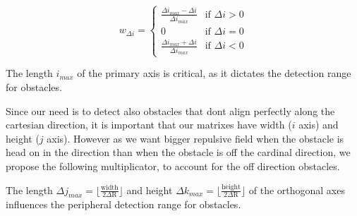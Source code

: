 \documentclass[letterpaper, 10 pt, conference]{ieeeconf}  %
\begin{document}
\begin{equation}
	w_{\Delta i} = 
	\begin{cases} 
	 	\frac{\Delta i_{max} - \Delta i}{\Delta i_{max}} & \text{if } \Delta i > 0 \\
		0 & \text{if } \Delta i = 0 \\
		\frac{\Delta i_{max} + \Delta i}{\Delta i_{max}}& \text{if } \Delta i < 0 
	\end{cases}
\end{equation}

The length $i_{max}$ of the primary axis is critical, as it dictates the detection range for obstacles. 



Since our need is to detect also obstacles that dont align perfectly along the cartesian direction, it is important that our matrixes have width ($i$ axis) and height ($j$ axis). However as we want bigger repulsive field when the obstacle is head on in the direction than when the obstacle is off the cardinal direction, we propose the following multiplicator, to account for the off direction obstacles.

The length $\Delta j_{max} = \lfloor \frac{\mathrm{width}}{2 \Delta \mathrm{R}} \rfloor$ and height $\Delta k_{max} = \lfloor \frac{\mathrm{height}}{2 \Delta \mathrm{R}} \rfloor$ of the orthogonal axes influences the peripheral detection range for obstacles. 


\end{document}
